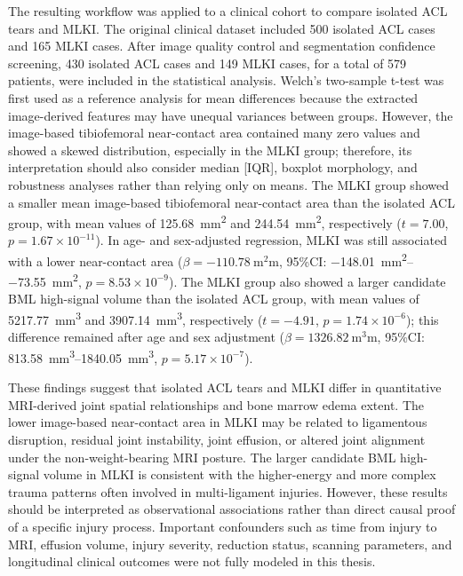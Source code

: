 \begin{digest}
  The resulting workflow was applied to a clinical cohort to compare isolated ACL tears and MLKI. The original clinical dataset included \num{500} isolated ACL cases and \num{165} MLKI cases. After image quality control and segmentation confidence screening, \num{430} isolated ACL cases and \num{149} MLKI cases, for a total of \num{579} patients, were included in the statistical analysis. Welch's two-sample t-test was first used as a reference analysis for mean differences because the extracted image-derived features may have unequal variances between groups. However, the image-based tibiofemoral near-contact area contained many zero values and showed a skewed distribution, especially in the MLKI group; therefore, its interpretation should also consider median [IQR], boxplot morphology, and robustness analyses rather than relying only on means. The MLKI group showed a smaller mean image-based tibiofemoral near-contact area than the isolated ACL group, with mean values of \qty{125.68}{\square\milli\metre} and \qty{244.54}{\square\milli\metre}, respectively ($t=7.00$, $p=1.67\times10^{-11}$). In age- and sex-adjusted regression, MLKI was still associated with a lower near-contact area ($\beta=\qty{-110.78}{\square\milli\metre}$, 95\%CI: \qtyrange{-148.01}{-73.55}{\square\milli\metre}, $p=8.53\times10^{-9}$). The MLKI group also showed a larger candidate BML high-signal volume than the isolated ACL group, with mean values of \qty{5217.77}{\cubic\milli\metre} and \qty{3907.14}{\cubic\milli\metre}, respectively ($t=-4.91$, $p=1.74\times10^{-6}$); this difference remained after age and sex adjustment ($\beta=\qty{1326.82}{\cubic\milli\metre}$, 95\%CI: \qtyrange{813.58}{1840.05}{\cubic\milli\metre}, $p=5.17\times10^{-7}$).

  These findings suggest that isolated ACL tears and MLKI differ in quantitative MRI-derived joint spatial relationships and bone marrow edema extent. The lower image-based near-contact area in MLKI may be related to ligamentous disruption, residual joint instability, joint effusion, or altered joint alignment under the non-weight-bearing MRI posture. The larger candidate BML high-signal volume in MLKI is consistent with the higher-energy and more complex trauma patterns often involved in multi-ligament injuries. However, these results should be interpreted as observational associations rather than direct causal proof of a specific injury process. Important confounders such as time from injury to MRI, effusion volume, injury severity, reduction status, scanning parameters, and longitudinal clinical outcomes were not fully modeled in this thesis.


\end{digest}
